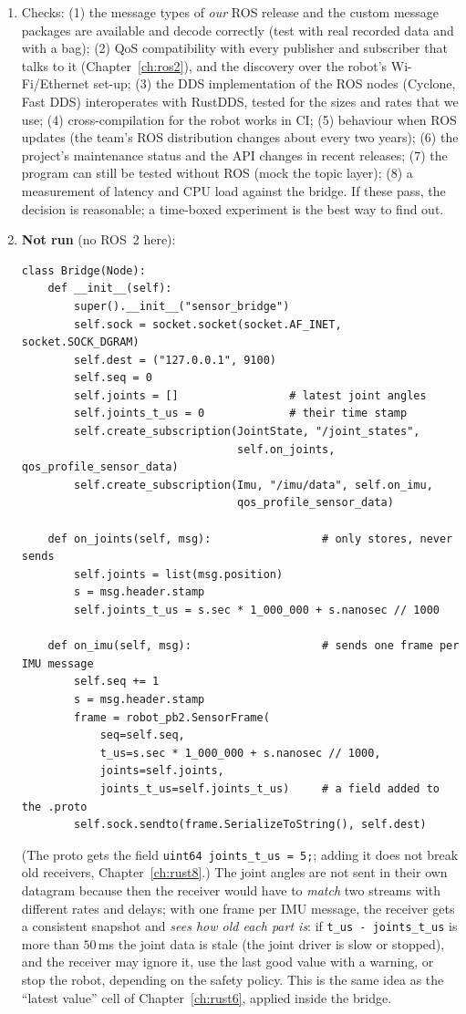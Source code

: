 \begin{enumerate}[label=\textbf{\ansnum.\arabic*}]
  \item Checks: (1) the message types of \emph{our} ROS release and the custom message packages are available and decode correctly (test with real recorded data and with a bag); (2) QoS compatibility with every publisher and subscriber that talks to it (Chapter~\ref{ch:ros2}), and the discovery over the robot's Wi-Fi/Ethernet set-up; (3) the DDS implementation of the ROS nodes (Cyclone, Fast DDS) interoperates with RustDDS, tested for the sizes and rates that we use; (4) cross-compilation for the robot works in CI; (5) behaviour when ROS updates (the team's ROS distribution changes about every two years); (6) the project's maintenance status and the API changes in recent releases; (7) the program can still be tested without ROS (mock the topic layer); (8) a measurement of latency and CPU load against the bridge. If these pass, the decision is reasonable; a time-boxed experiment is the best way to find out.
  \item[\textbf{\ansnum.10}$\star$] \textbf{Not run} (no ROS~2 here):
\begin{verbatim}
class Bridge(Node):
    def __init__(self):
        super().__init__("sensor_bridge")
        self.sock = socket.socket(socket.AF_INET, socket.SOCK_DGRAM)
        self.dest = ("127.0.0.1", 9100)
        self.seq = 0
        self.joints = []                 # latest joint angles
        self.joints_t_us = 0             # their time stamp
        self.create_subscription(JointState, "/joint_states",
                                 self.on_joints, qos_profile_sensor_data)
        self.create_subscription(Imu, "/imu/data", self.on_imu,
                                 qos_profile_sensor_data)

    def on_joints(self, msg):                 # only stores, never sends
        self.joints = list(msg.position)
        s = msg.header.stamp
        self.joints_t_us = s.sec * 1_000_000 + s.nanosec // 1000

    def on_imu(self, msg):                    # sends one frame per IMU message
        self.seq += 1
        s = msg.header.stamp
        frame = robot_pb2.SensorFrame(
            seq=self.seq,
            t_us=s.sec * 1_000_000 + s.nanosec // 1000,
            joints=self.joints,
            joints_t_us=self.joints_t_us)     # a field added to the .proto
        self.sock.sendto(frame.SerializeToString(), self.dest)
\end{verbatim}
(The proto gets the field \verb!uint64 joints_t_us = 5;!; adding it does not break old receivers, Chapter~\ref{ch:rust8}.) The joint angles are not sent in their own datagram because then the receiver would have to \emph{match} two streams with different rates and delays; with one frame per IMU message, the receiver gets a consistent snapshot and \emph{sees how old each part is}: if \verb!t_us - joints_t_us! is more than $50$\,ms the joint data is stale (the joint driver is slow or stopped), and the receiver may ignore it, use the last good value with a warning, or stop the robot, depending on the safety policy. This is the same idea as the ``latest value'' cell of Chapter~\ref{ch:rust6}, applied inside the bridge.
\end{enumerate}
